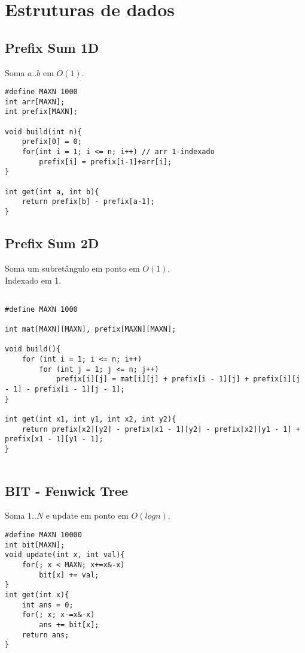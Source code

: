 \chapter{Estruturas de dados}

\section{Prefix Sum 1D}

Soma $a..b$ em $O(1)$.
\begin{multicols}{2}
\begin{lstlisting}
#define MAXN 1000
int arr[MAXN];
int prefix[MAXN];

void build(int n){
	prefix[0] = 0;
	for(int i = 1; i <= n; i++) // arr 1-indexado
		prefix[i] = prefix[i-1]+arr[i];
}

int get(int a, int b){
	return prefix[b] - prefix[a-1];
}

\end{lstlisting}
\end{multicols}


\section{Prefix Sum 2D}

Soma um subretângulo em ponto em $O(1)$. \\
Indexado em 1.

\begin{lstlisting}

#define MAXN 1000

int mat[MAXN][MAXN], prefix[MAXN][MAXN];

void build(){
	for (int i = 1; i <= n; i++) 
		for (int j = 1; j <= n; j++)
			prefix[i][j] = mat[i][j] + prefix[i - 1][j] + prefix[i][j - 1] - prefix[i - 1][j - 1];
}

int get(int x1, int y1, int x2, int y2){
	return prefix[x2][y2] - prefix[x1 - 1][y2] - prefix[x2][y1 - 1] + prefix[x1 - 1][y1 - 1];
}


\end{lstlisting}

\section{BIT - Fenwick Tree}

Soma $1..N$ e update em ponto em $O(log n)$.
\begin{multicols}{2}
	\begin{lstlisting}
#define MAXN 10000
int bit[MAXN];
void update(int x, int val){
	for(; x < MAXN; x+=x&-x)
		bit[x] += val;
}
int get(int x){
	int ans = 0;
	for(; x; x-=x&-x)
		ans += bit[x];
	return ans;
}
	\end{lstlisting}
\end{multicols}


